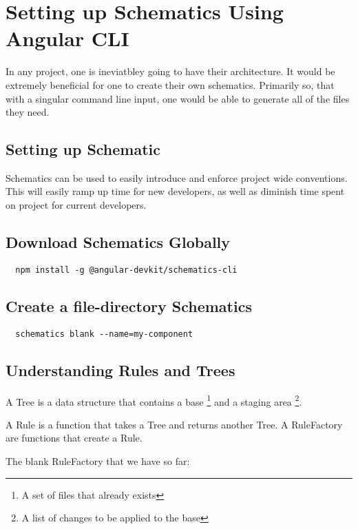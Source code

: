 \maketitle{}
\section{ Setting up Schematics Using Angular CLI }

In any project, one is ineviatbley going to have their architecture. It would
be extremely beneficial for one to create their own schematics. Primarily so,
that with a singular command line input, one would be able to generate all of
the files they need.

\subsection{ Setting up Schematic }

Schematics can be used to easily introduce and enforce project wide conventions.
This will easily ramp up time for new developers, as well as diminish time
spent on project for current developers.

\subsection{ Download Schematics Globally }
\begin{lstlisting}
  npm install -g @angular-devkit/schematics-cli
\end{lstlisting}

\subsection{ Create a file-directory Schematics }
\begin{lstlisting}
  schematics blank --name=my-component
\end{lstlisting}

\subsection{ Understanding Rules and Trees }
A Tree is a data structure that contains a base \footnote{A set of files that already exists}
and a staging area \footnote{A list of changes to be applied to the base}.

A Rule is a function that takes a Tree and returns another Tree. A RuleFactory
are functions that create a Rule.

The blank RuleFactory that we have so far:

